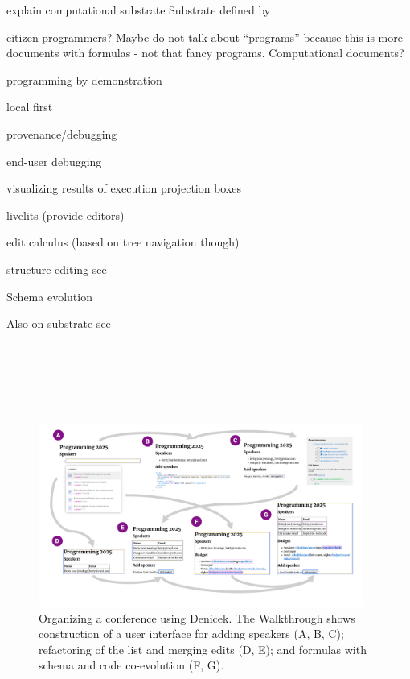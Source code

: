 \documentclass[sigconf,anonymous,screen]{acmart}
\begin{document}
explain computational substrate
Substrate defined by \cite{jakubovic-2022-ladder}

citizen programmers? Maybe do not talk about ``programs'' because this is more documents with
formulas - not that fancy programs. Computational documents?



programming by demonstration
\cite{leiva-2021-rapido,cypher-1993-pbd}
\cite{chen-2023-miwa}

local first
\cite{kleppmann-2019-local,klokmose-2024-mywebstrates}

provenance/debugging
\cite{ko-2004-whyline,ko-2009-whyline,krebs-2023-probelog}
\cite{ricciotti-2017-imperative,perera-2012-functional}
\cite{perera-2022-linked}

end-user debugging
\cite{kissinger-2006-debugging}

visualizing results of execution
projection boxes \cite{lerner-2020-boxes}

livelits (provide editors)
\cite{omar-2021-livelits}

edit calculus (based on tree navigation though)
\cite{omar-2017-hazelnut}

structure editing see \cite{beckman-2023-sandblocks}

Schema evolution

Also on substrate see




~

~

\newpage
~


\begin{figure}[t]
\vspace{-0.5em}
\includegraphics[width=0.95\textwidth,clip,trim=1cm 1cm 1cm 0.5cm]{fig/walkthrough.pdf}
\vspace{-1em}
\caption{Organizing a conference using Denicek. The Walkthrough shows construction of a user
  interface for adding speakers (A, B, C); refactoring of the list and merging edits (D, E); and
  formulas with schema and code co-evolution (F, G).}
\label{fig:walkthrough}
\end{figure}
\end{document}
